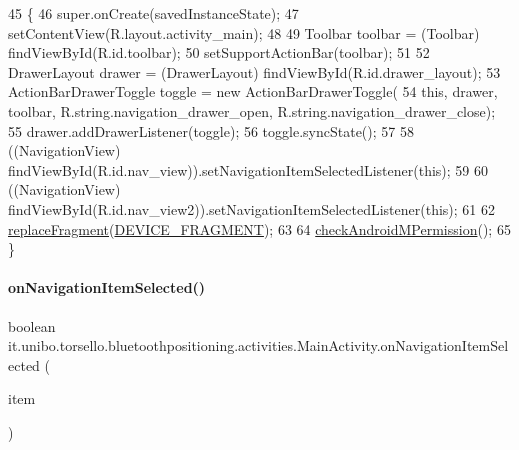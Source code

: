 \begin{DoxyCode}
45                                                        \{
46         super.onCreate(savedInstanceState);
47         setContentView(R.layout.activity\_main);
48 
49         Toolbar toolbar = (Toolbar) findViewById(R.id.toolbar);
50         setSupportActionBar(toolbar);
51 
52         DrawerLayout drawer = (DrawerLayout) findViewById(R.id.drawer\_layout);
53         ActionBarDrawerToggle toggle = \textcolor{keyword}{new} ActionBarDrawerToggle(
54                 \textcolor{keyword}{this}, drawer, toolbar, R.string.navigation\_drawer\_open, R.string.navigation\_drawer\_close);
55         drawer.addDrawerListener(toggle);
56         toggle.syncState();
57 
58         ((NavigationView) findViewById(R.id.nav\_view)).setNavigationItemSelectedListener(\textcolor{keyword}{this});
59 
60         ((NavigationView) findViewById(R.id.nav\_view2)).setNavigationItemSelectedListener(\textcolor{keyword}{this});
61 
62         \hyperlink{classit_1_1unibo_1_1torsello_1_1bluetoothpositioning_1_1activities_1_1MainActivity_a98db4478d28cd91118138d0b652ceb2c_a98db4478d28cd91118138d0b652ceb2c}{replaceFragment}(\hyperlink{classit_1_1unibo_1_1torsello_1_1bluetoothpositioning_1_1activities_1_1MainActivity_a2f77c0245ac2525dc58905e38e1817d1_a2f77c0245ac2525dc58905e38e1817d1}{DEVICE\_FRAGMENT});
63 
64         \hyperlink{classit_1_1unibo_1_1torsello_1_1bluetoothpositioning_1_1activities_1_1MainActivity_ab762aac3d11f5b0ccc6042a140804d5d_ab762aac3d11f5b0ccc6042a140804d5d}{checkAndroidMPermission}();
65     \}
\end{DoxyCode}
\hypertarget{classit_1_1unibo_1_1torsello_1_1bluetoothpositioning_1_1activities_1_1MainActivity_a7cfc0a2ee94c12afaac3b7472eeb75b7_a7cfc0a2ee94c12afaac3b7472eeb75b7}{}\label{classit_1_1unibo_1_1torsello_1_1bluetoothpositioning_1_1activities_1_1MainActivity_a7cfc0a2ee94c12afaac3b7472eeb75b7_a7cfc0a2ee94c12afaac3b7472eeb75b7} 
\paragraph{\texorpdfstring{on\+Navigation\+Item\+Selected()}{onNavigationItemSelected()}}
{\footnotesize\ttfamily boolean it.\+unibo.\+torsello.\+bluetoothpositioning.\+activities.\+Main\+Activity.\+on\+Navigation\+Item\+Selected (\begin{DoxyParamCaption}\item[{Menu\+Item}]{item }\end{DoxyParamCaption})}


